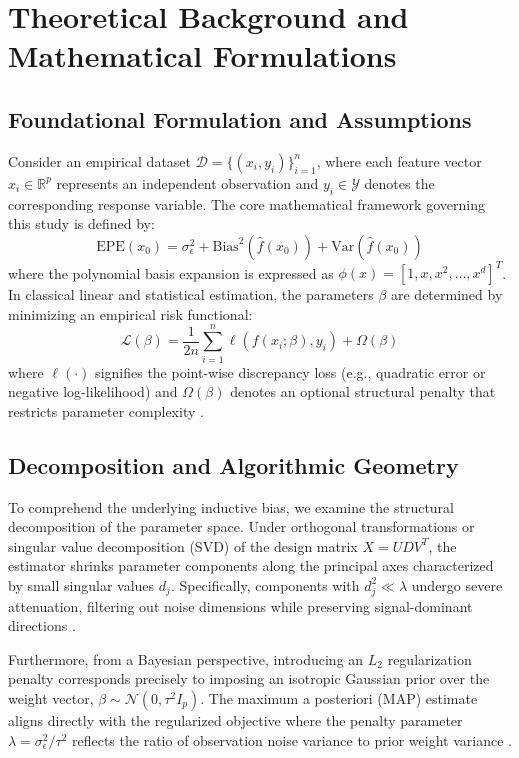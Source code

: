 \section{Theoretical Background and Mathematical Formulations}

\subsection{Foundational Formulation and Assumptions}
Consider an empirical dataset $\mathcal{D} = \{(x_i, y_i)\}_{i=1}^n$, where each feature vector $x_i \in \mathbb{R}^p$ represents an independent observation and $y_i \in \mathcal{Y}$ denotes the corresponding response variable. The core mathematical framework governing this study is defined by:
\begin{equation}
  \text{EPE}(x_0) = \sigma_\epsilon^2 + \text{Bias}^2(\hat{f}(x_0)) + \text{Var}(\hat{f}(x_0))
\label{eq:core_math}
\end{equation}
where the polynomial basis expansion is expressed as $\phi(x) = [1, x, x^2, \dots, x^d]^T$.
In classical linear and statistical estimation, the parameters $\beta$ are determined by minimizing an empirical risk functional:
\begin{equation}
  \mathcal{L}(\beta) = \frac{1}{2n} \sum_{i=1}^n \ell(f(x_i; \beta), y_i) + \Omega(\beta)
\end{equation}
where $\ell(\cdot)$ signifies the point-wise discrepancy loss (e.g., quadratic error or negative log-likelihood) and $\Omega(\beta)$ denotes an optional structural penalty that restricts parameter complexity \cite{bishop2006}.

\subsection{Decomposition and Algorithmic Geometry}
To comprehend the underlying inductive bias, we examine the structural decomposition of the parameter space. Under orthogonal transformations or singular value decomposition (SVD) of the design matrix $X = U D V^T$, the estimator shrinks parameter components along the principal axes characterized by small singular values $d_j$. Specifically, components with $d_j^2 \ll \lambda$ undergo severe attenuation, filtering out noise dimensions while preserving signal-dominant directions \cite{hoerl1970}.

Furthermore, from a Bayesian perspective, introducing an $L_2$ regularization penalty corresponds precisely to imposing an isotropic Gaussian prior over the weight vector, $\beta \sim \mathcal{N}(0, \tau^2 I_p)$. The maximum a posteriori (MAP) estimate aligns directly with the regularized objective where the penalty parameter $\lambda = \sigma_\epsilon^2 / \tau^2$ reflects the ratio of observation noise variance to prior weight variance \cite{murphy2012}.

